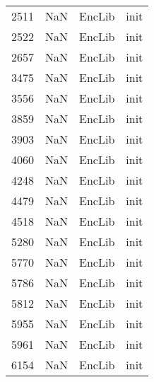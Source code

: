 \begin{tabular}{llll}
2511 &                   NaN &                     EncLib &                                      init \\
2522 &                   NaN &                     EncLib &                                      init \\
2657 &                   NaN &                     EncLib &                                      init \\
3475 &                   NaN &                     EncLib &                                      init \\
3556 &                   NaN &                     EncLib &                                      init \\
3859 &                   NaN &                     EncLib &                                      init \\
3903 &                   NaN &                     EncLib &                                      init \\
4060 &                   NaN &                     EncLib &                                      init \\
4248 &                   NaN &                     EncLib &                                      init \\
4479 &                   NaN &                     EncLib &                                      init \\
4518 &                   NaN &                     EncLib &                                      init \\
5280 &                   NaN &                     EncLib &                                      init \\
5770 &                   NaN &                     EncLib &                                      init \\
5786 &                   NaN &                     EncLib &                                      init \\
5812 &                   NaN &                     EncLib &                                      init \\
5955 &                   NaN &                     EncLib &                                      init \\
5961 &                   NaN &                     EncLib &                                      init \\
6154 &                   NaN &                     EncLib &                                      init \\

\end{tabular}
